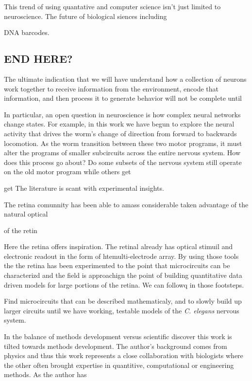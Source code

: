 This trend of using quantative and computer science isn't just limited to neuroscience.
The future of  biological siences including 

DNA barcodes.



\subsection*{END HERE?}

The ultimate indication that we will have understand how a collection of neurons work together to receive information from the environment, encode that information, and then process it to generate  behavior will not be complete until 


In particular, an open question in neuroscience is how  complex neural networks change states. For example, in this work we have begun to explore the neural activity that drives the worm's change of direction from forward to backwards locomotion. As the worm transition between these two motor programs, it must alter the programs of smaller subcircuits across the entire nervous system. How does this process go about? Do some subsets of the nervous system still operate on the old motor program while others get 

 get  The literature is scant with experimental insights.  







The retina comunnity has been able to amass considerable taken advantage of the natural optical 

 of the retin

Here the retina offers inspiration. The retinal already has optical stimuil and electronic readout in the form of htemulti-electrode array. By using those tools the the retina has been experimented to the point that microcircuits can be characterizd and the field is approachign the point of building quantitative data driven models for large portions of the retina. We can followq in those footsteps.

Find microcircuits that can be described mathematicaly, and to slowly build up larger circuits until we have working, testable models of the \textit{C. elegans} nervous system.

 





In the balance of methods development versus scientific discover this work is tilted towards methods development. The author's background comes from physics and thus this work represents a close collaboration with biologists where the other often brought expertise in quantitive, computational or engineering methods. As the author has 
